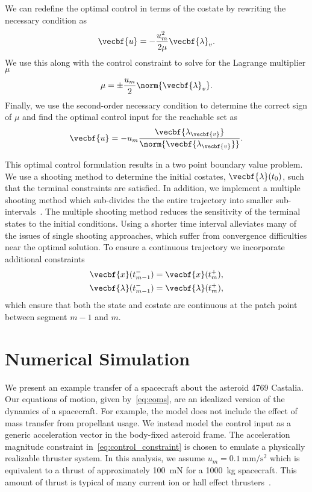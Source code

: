 We can redefine the optimal control in terms of the costate by rewriting the necessary condition as
\begin{align*}
    \vecbf{u} = - \frac{u_m^2}{2 \mu} \vecbf{\lambda}_v .
\end{align*}
We use this along with the control constraint to solve for the Lagrange multiplier \( \mu \)
\begin{align*}
    \mu = \pm \frac{u_m}{2} \norm{\vecbf{\lambda}_v} .
\end{align*}
Finally, we use the second-order necessary condition to determine the correct sign of \( \mu \) and find the optimal control input for the reachable set as
\begin{align}\label{eq:optimal_control}
    \vecbf{u} = - u_m \frac{\vecbf{\lambda_{\vecbf{v}}}}{\norm{\vecbf{\lambda_{\vecbf{v}}}}} .
\end{align}

This optimal control formulation results in a two point boundary value problem.
We use a shooting method to determine the initial costates, \( \vecbf{\lambda}(t_0)\), such that the terminal constraints are satisfied.
In addition, we implement a multiple shooting method which sub-divides the the entire trajectory into smaller sub-intervals~\cite{stoer2013}.
The multiple shooting method reduces the sensitivity of the terminal states to the initial conditions.
Using a shorter time interval alleviates many of the issues of single shooting approaches, which suffer from convergence difficulties near the optimal solution.
To ensure a continuous trajectory we incorporate additional constraints
\begin{align}\label{sec:interior_constraints}
    \begin{split}
        \vecbf{x}(t_{m-1}^{-}) &= \vecbf{x}(t_{m}^{+}) , \\
        \vecbf{\lambda}(t_{m-1}^{-}) &= \vecbf{\lambda}(t_{m}^{+}),        
    \end{split}
\end{align}
which ensure that both the state and costate are continuous at the patch point between segment \( m-1 \) and \( m\).

\section{Numerical Simulation}\label{sec:simulation}

We present an example transfer of a spacecraft about the asteroid 4769 Castalia. 
Our equations of motion, given by~\cref{eq:eoms}, are an idealized version of the dynamics of a spacecraft.
For example, the model does not include the effect of mass transfer from propellant usage. 
We instead model the control input as a generic acceleration vector in the body-fixed asteroid frame. 
The acceleration magnitude constraint in~\cref{eq:control_constraint} is chosen to emulate a physically realizable thruster system.
In this analysis, we assume \( u_m = \SI{0.1}{\milli\meter\per\second\squared}\) which is equivalent to a thrust of approximately \SI{100}{\milli\newton} for a \SI{1000}{\kilo\gram} spacecraft.
This amount of thrust is typical of many current ion or hall effect thrusters~\cite{goebel2008 ,choueiri2009}.

